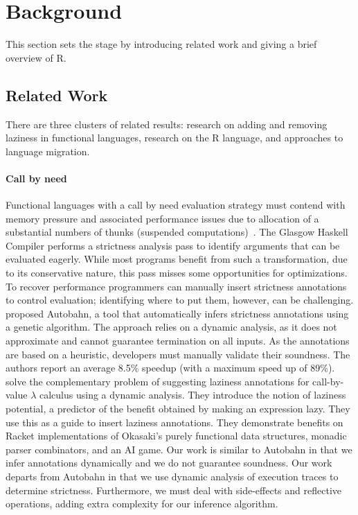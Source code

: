 \documentclass[review,nonacm,screen,acmsmall,anonymous=true]{acmart}
\begin{document}
\newpage
\section{Background}\label{sec:background}

This section sets the stage by introducing related work and giving a brief
overview of R.

\subsection{Related Work}

There are three clusters of related results: research on adding and removing
laziness in functional languages, research on the R language, and approaches to
language migration.

\paragraph{Call by need}  Functional languages with
a call by need evaluation strategy must contend with memory pressure and
associated performance issues due to allocation of a substantial numbers of
thunks (suspended computations)~\cite{transformopt,stricteffective,opteval}. The
Glasgow Haskell Compiler performs a strictness analysis pass to identify
arguments that can be evaluated eagerly. While most programs benefit from such a
transformation, due to its conservative nature, this pass misses some
opportunities for optimizations. To recover performance programmers can manually
insert strictness annotations to control evaluation; identifying where to put
them, however, can be challenging. \citet{autobahn} proposed Autobahn, a tool
that automatically infers strictness annotations using a genetic algorithm. The
approach relies on a dynamic analysis, as it does not approximate and cannot
guarantee termination on all inputs. As the annotations are based on a
heuristic, developers must manually validate their soundness. The authors report
an average 8.5\% speedup (with a maximum speed up of 89\%). \citet{lazyprof}
solve the complementary problem of suggesting laziness annotations for
call-by-value $\lambda$ calculus using a dynamic analysis. They introduce the
notion of laziness potential, a predictor of the benefit obtained by making an
expression lazy. They use this as a guide to insert laziness annotations. They
demonstrate benefits on Racket implementations of Okasaki's purely functional
data structures, monadic parser combinators, and an AI game. Our work is similar
to Autobahn in that we infer annotations dynamically and we do not guarantee
soundness. Our work departs from Autobahn in that we use dynamic analysis of
execution traces to determine strictness. Furthermore, we must deal with
side-effects and reflective operations, adding extra complexity for our
inference algorithm.
\end{document}
